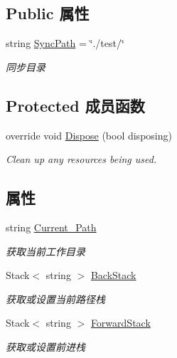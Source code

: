 \subsection*{Public 属性}
\begin{DoxyCompactItemize}
\item 
string \hyperlink{classcustom__cloud_1_1_cloud_disk_form_a0c264c17ab23f32d5dbb86348abf5ef3}{Sync\+Path} = \char`\"{}./test/\char`\"{}
\begin{DoxyCompactList}\small\item\em 同步目录 \end{DoxyCompactList}\end{DoxyCompactItemize}
\subsection*{Protected 成员函数}
\begin{DoxyCompactItemize}
\item 
override void \hyperlink{classcustom__cloud_1_1_cloud_disk_form_a7fafcdfae9c188d428b2ec28e79d7c75}{Dispose} (bool disposing)
\begin{DoxyCompactList}\small\item\em Clean up any resources being used. \end{DoxyCompactList}\end{DoxyCompactItemize}
\subsection*{属性}
\begin{DoxyCompactItemize}
\item 
string \hyperlink{classcustom__cloud_1_1_cloud_disk_form_ac51f41eb78c27ed50ea7d3151eb441c4}{Current\+\_\+\+Path}
\begin{DoxyCompactList}\small\item\em 获取当前工作目录 \end{DoxyCompactList}\item 
Stack$<$ string $>$ \hyperlink{classcustom__cloud_1_1_cloud_disk_form_a0d274199b04a301fde56e7a59616a372}{Back\+Stack}
\begin{DoxyCompactList}\small\item\em 获取或设置当前路径栈 \end{DoxyCompactList}\item 
Stack$<$ string $>$ \hyperlink{classcustom__cloud_1_1_cloud_disk_form_a6a6a9bf7c200971684e8b2e68e97ed4d}{Forward\+Stack}
\begin{DoxyCompactList}\small\item\em 获取或设置前进栈 \end{DoxyCompactList}\end{DoxyCompactItemize}


